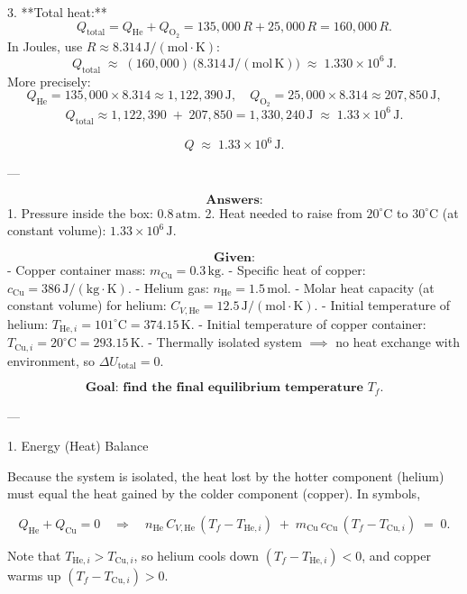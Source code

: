 \documentclass[12pt]{article}
\theoremstyle{definition} %
\theoremstyle{plain} %
\begin{document}
3. **Total heat:**
   \[
   Q_{\mathrm{total}} = Q_{\mathrm{He}} + Q_{\mathrm{O_2}}
                      = 135{,}000\,R + 25{,}000\,R
                      = 160{,}000\,R.
   \]
   In Joules, use \(R \approx 8.314\,\mathrm{J/(mol\cdot K)}\):
   \[
   Q_{\mathrm{total}}
   \;\approx\; (160{,}000)\,\bigl(8.314\,\mathrm{J/(mol\,K)}\bigr)
   \;\approx\; 1.330 \times 10^6\,\mathrm{J}.
   \]
   More precisely:
   \[
   Q_{\mathrm{He}} = 135{,}000 \times 8.314 \approx 1{,}122{,}390\,\mathrm{J},
   \quad
   Q_{\mathrm{O_2}} = 25{,}000 \times 8.314 \approx 207{,}850\,\mathrm{J},
   \]
   \[
   Q_{\mathrm{total}} \approx 1{,}122{,}390 \;+\; 207{,}850 
                       = 1{,}330{,}240\,\mathrm{J}
                       \;\approx\; 1.33 \times 10^6\,\mathrm{J}.
   \]

\[
\boxed{Q \;\approx\; 1.33 \times 10^6\,\mathrm{J}.}
\]

---

\[
\textbf{Answers:}
\]
1. Pressure inside the box: \(\boxed{0.8\,\mathrm{atm}}\).
2. Heat needed to raise from \(20^\circ\mathrm{C}\) to \(30^\circ\mathrm{C}\) (at constant volume): \(\boxed{1.33\times 10^6\,\mathrm{J}}\).

\[
\textbf{Given:}
\]
- Copper container mass: \(m_\text{Cu} = 0.3\,\mathrm{kg}\).
- Specific heat of copper: \(c_\text{Cu} = 386\,\mathrm{J/(kg\cdot K)}\).
- Helium gas: \(n_\text{He} = 1.5\,\mathrm{mol}\).
- Molar heat capacity (at constant volume) for helium: \(C_{V,\text{He}} = 12.5\,\mathrm{J/(mol\cdot K)}\).
- Initial temperature of helium: \(T_{\text{He},i} = 101^\circ\mathrm{C} = 374.15\,\mathrm{K}\).
- Initial temperature of copper container: \(T_{\text{Cu},i} = 20^\circ\mathrm{C} = 293.15\,\mathrm{K}\).
- Thermally isolated system \(\implies\) no heat exchange with environment, so \(\Delta U_{\text{total}}=0\).

\[
\textbf{Goal: find the final equilibrium temperature } T_f.
\]

---

1. Energy (Heat) Balance

Because the system is isolated, the heat lost by the hotter component (helium) must equal the heat gained by the colder component (copper).  In symbols,

\[
Q_{\text{He}} + Q_{\text{Cu}} = 0
\quad\Longrightarrow\quad
n_\text{He}\,C_{V,\text{He}}\,(T_f - T_{\text{He},i})
\;+\;
m_\text{Cu}\,c_\text{Cu}\,(T_f - T_{\text{Cu},i})
\;=\;0.
\]

Note that \(T_{\text{He},i} > T_{\text{Cu},i}\), so helium cools down \((T_f - T_{\text{He},i})<0\), and copper warms up \((T_f - T_{\text{Cu},i})>0\).
\end{document}
